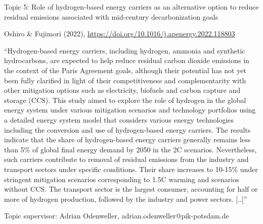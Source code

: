 \documentclass[10pt,aspectratio=169,dvipsnames]{beamer}
\begin{document}
\begin{frame}
  \begin{block}{Topic 5: Role of hydrogen-based energy carriers as an alternative option to reduce residual emissions associated with mid-century decarbonization goals}
      
    Oshiro \& Fujimori (2022), \href{https://doi.org/10.1016/j.apenergy.2022.118803}{https://doi.org/10.1016/j.apenergy.2022.118803}
    
    \enquote{Hydrogen-based energy carriers, including hydrogen, ammonia and synthetic hydrocarbons, are expected to help reduce residual carbon dioxide emissions in the context of the Paris Agreement goals, although their potential has not yet been fully clarified in light of their competitiveness and complementarity with other mitigation options such as electricity, biofuels and carbon capture and storage (CCS). This study aimed to explore the role of hydrogen in the global energy system under various mitigation scenarios and technology portfolios using a detailed energy system model that considers various energy technologies including the conversion and use of hydrogen-based energy carriers. The results indicate that the share of hydrogen-based energy carriers generally remains less than 5\% of global final energy demand by 2050 in the 2\degree\hspace{0pt}C scenarios. Nevertheless, such carriers contribute to removal of residual emissions from the industry and transport sectors under specific conditions. Their share increases to 10-15\% under stringent mitigation scenarios corresponding to 1.5\degree\hspace{0pt}C warming and scenarios without CCS. The transport sector is the largest consumer, accounting for half or more of hydrogen production, followed by the industry and power sectors. [..]}

    \hfill
    Topic supervisor: Adrian Odenweller, adrian.odenweller@pik-potsdam.de
    
  \end{block}
\end{frame}
\end{document}
